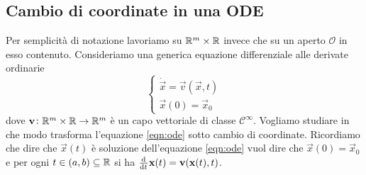 \subsection{Cambio di coordinate in una ODE}
Per semplicità di notazione lavoriamo su $ \mathbb{R}^m \times \mathbb{R} $ invece che su un aperto $ \mathcal{O} $ in esso contenuto. Consideriamo una generica equazione differenziale alle derivate ordinarie
\begin{equation} \label{eqn:ode}
    \begin{cases}
    \dot{\vec{x}} = \vec{v}(\vec{x}, t) \\
    \vec{x}(0) = \vec{x}_0
    \end{cases}
\end{equation}
dove $ \mathbf{v} \colon \mathbb{R}^{m} \times \mathbb{R} \to \mathbb{R}^m $ è un capo vettoriale di classe $ \mathcal{C}^{\infty} $. Vogliamo studiare in che modo trasforma l'equazione \eqref{eqn:ode} sotto cambio di coordinate. Ricordiamo che dire che $ \vec{x}(t) $ è soluzione dell'equazione \eqref{eqn:ode} vuol dire che $ \vec{x}(0) = \vec{x}_0 $ e per ogni $ t \in (a, b) \subseteq \mathbb{R} $ si ha $ \od{}{t} \vec{x}(t) = \vec{v}(\vec{x}(t), t) $. \\

